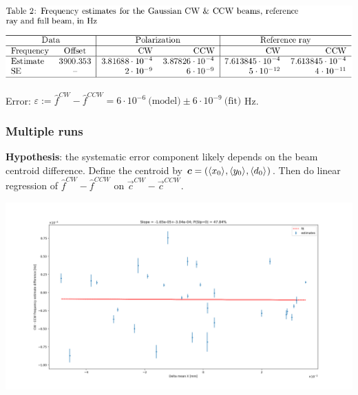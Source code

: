 \documentclass{beamer}
\begin{document}
\begin{frame}
\begin{columns}
\begin{column}{.5\textwidth}
\begin{center}
      \end{center}
    \end{column}
  \end{columns}
  \vspace*{-.2cm}
  \begin{center}
    \includegraphics[height=.25\paperheight]{img/spin_axis_motion/presentation/gauss_beam_table}
  \end{center}
  \vspace*{-.3cm}
    Error: $\varepsilon := \hat f^{CW} - \hat f^{CCW} = 6\cdot 10^{-6}~\text{(model)} \pm 6\cdot 10^{-9}~\text{(fit)}$ Hz.
\end{frame}
\begin{frame}
  \frametitle{Multiple runs}
  \textbf{Hypothesis}: the systematic error component likely depends on the beam centroid difference. Define the centroid by $\vec c = (\avg{x_0}, \avg{y_0}, \avg{d_0})$. Then do linear regression of $\hat f^{CW} - \hat f^{CCW}$ on $\vec c^{CW} - \vec c^{CCW}$.
  \begin{center}
    \includegraphics[height=.5\paperheight]{img/spin_axis_motion/freq_estimates_vs_centroid_diff_X}
  \end{center}
\end{frame}
\end{document}
